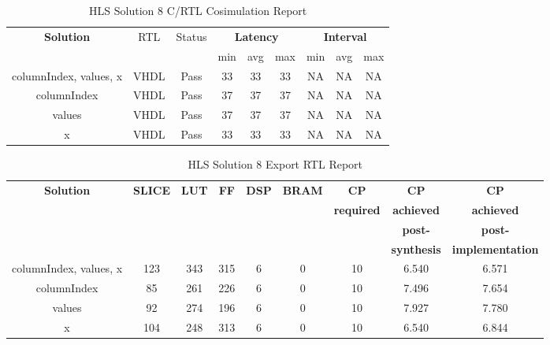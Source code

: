 \begin{table}[H]
	\centering
	\begin{tabular}{|c|c|c|c|c|c|c|c|c|}
		\hline
		\multicolumn{1}{|c|}{\textbf{Solution}} & \multicolumn{1}{|c|}{RTL} & \multicolumn{1}{|c|}{Status} & \multicolumn{3}{c|}{\textbf{Latency}} & \multicolumn{3}{c|}{\textbf{Interval}} \\
		& &  & min & avg & max & min & avg & max \\
		\hline
		columnIndex, values, x & VHDL & Pass & 33 & 33 & 33 & NA & NA & NA \\
		\hline
		columnIndex & VHDL & Pass & 37 & 37 & 37 & NA & NA & NA \\
		\hline
		values & VHDL & Pass & 37 & 37 & 37 & NA & NA & NA \\
		\hline
		x & VHDL & Pass & 33 & 33 & 33 & NA & NA & NA \\
		\hline
	\end{tabular}
	\caption{HLS Solution 8 C/RTL Cosimulation Report }
	\label{tab:hls-solution-8-cosimulation-report}
\end{table}

\begin{table}[H]
	\centering
	\begin{tabular}{|c|c|c|c|c|c|c|c|c|}
		\hline
		\textbf{Solution} & \textbf{SLICE} & \textbf{LUT} & \textbf{FF} & \textbf{DSP} & \textbf{BRAM} & \textbf{CP} & \textbf{CP} & \textbf{CP} \\
		& & & & & & \textbf{required} & \textbf{achieved} & \textbf{achieved}\\
		& & & & & & & \textbf{post-} & \textbf{post-}\\
		& & & & & & & \textbf{synthesis} & \textbf{implementation}\\
		\hline
		columnIndex, values, x  & 123 & 343 & 315 & 6 & 0 & 10 & 6.540 & 6.571 \\
		\hline
		columnIndex  & 85 & 261 & 226 & 6 & 0 & 10 & 7.496 & 7.654 \\
		\hline
		values  & 92 & 274 & 196 & 6 & 0 & 10 & 7.927 & 7.780 \\
		\hline
		x  & 104 & 248 & 313 & 6 & 0 & 10 & 6.540 & 6.844 \\
		\hline
	\end{tabular}
	\caption{HLS Solution 8 Export RTL Report}
	\label{tab:hls-solution-8-export-rtl-report}
\end{table}